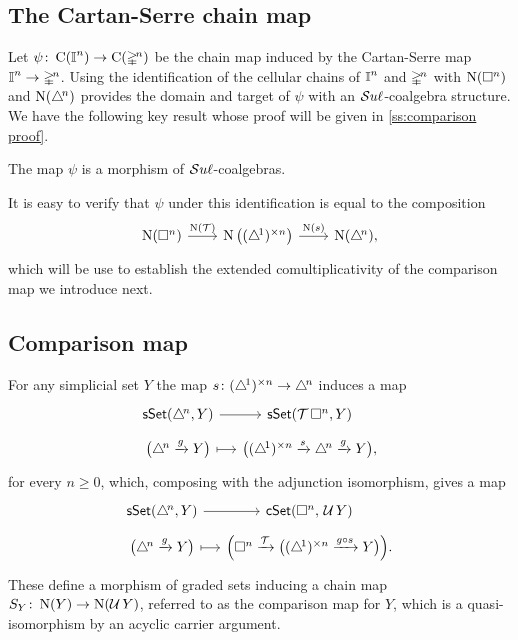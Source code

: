 \subsection{The Cartan-Serre chain map} \label{ss:the cartan-serre chain map}

Let $\psi \colon \operatorname{C}(\bm{\mathbb{I}}^n) \to \operatorname{C}(\mathbb{\Delta}^{\!n})$ be the chain map induced by the Cartan-Serre map $\bm{\mathbb{I}}^n \to \mathbb{\Delta}^{\!n}$.
Using the identification of the cellular chains of $\bm{\mathbb{I}}^n$ and $\mathbb{\Delta}^{\!n}$ with $\operatorname{N}(\square^n)$ and $\operatorname{N}(\triangle^{\!n})$
provides the domain and target of $\psi$ with an $\mathcal{S}u\ell$-coalgebra structure.
We have the following key result whose proof will be given in  \cref{ss:comparison proof}.

\begin{lemma} \label{l:cartan-serre is e infinity}
	The map $\psi$ is a morphism of $\mathcal{S}u\ell$-coalgebras.
\end{lemma}

It is easy to verify that $\psi$ under this identification is equal to the composition
\begin{equation*}
\begin{tikzcd}[column sep=normal]
\chains(\cube^n) \arrow[r, "\chains(\T)"] &[-3pt]
\chains \big( \scube{n} \big) \arrow[r, "\chains(s)"] &[-3pt]
\chains(\simplex^{\!n}),
\end{tikzcd}
\end{equation*}
which will be use to establish the extended comultiplicativity of the comparison map we introduce next.

\subsection{Comparison map} \label{ss:comparison map}

For any simplicial set $Y$ the map $s \colon (\triangle^{\!1})^{\times n} \to \triangle^{\!n}$ induces a map
\begin{equation*}
\begin{tikzcd}[column sep = small, row sep=tiny]
\sSet(\simplex^{\!n}, Y) \arrow[r] &
\sSet(\T \cube^n, Y) \\
\big( \simplex^{\!n} \xrightarrow{g} Y \big) \arrow[r, maps to] &
\big(\scube{n} \xrightarrow{s} \simplex^{\!n} \xrightarrow{g} Y \big),
\end{tikzcd}
\end{equation*}
for every $n \geq 0$, which, composing with the adjunction isomorphism, gives a map
\begin{equation*}
\begin{tikzcd}[column sep = small, row sep=tiny]
\sSet(\simplex^{\!n}, Y) \arrow[r] &
\cSet(\cube^n,\, \U Y) \\
\big( \simplex^{\!n} \xrightarrow{g} Y \big) \arrow[r, maps to] &
\Big(\cube^n \xrightarrow{\T} \big(\scube{n} \xrightarrow{g \circ s} Y \big)\Big).
\end{tikzcd}
\end{equation*}
These define a morphism of graded sets inducing a chain map $S_Y \colon \operatorname{N}(Y) \to \operatorname{N}(\operatorname{\mathcal{U}} Y)$, referred to as the comparison map for $Y$, which is a quasi-isomorphism by an acyclic carrier argument.

